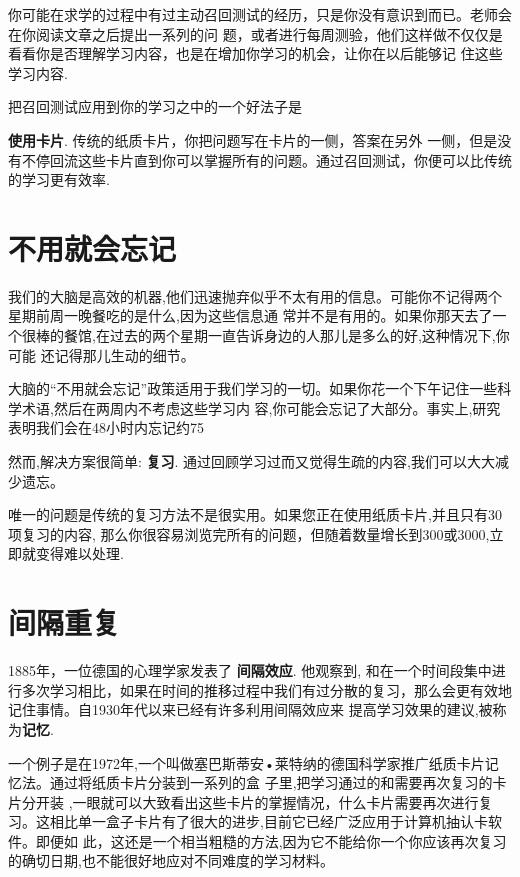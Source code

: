 \documentclass[a4paper]{book}
\begin{document}
你可能在求学的过程中有过主动召回测试的经历，只是你没有意识到而已。老师会在你阅读文章之后提出一系列的问 题，或者进行每周测验，他们这样做不仅仅是看看你是否理解学习内容，也是在增加你学习的机会，让你在以后能够记 住这些学习内容.

把召回测试应用到你的学习之中的一个好法子是

\textbf{使用卡片}. 传统的纸质卡片，你把问题写在卡片的一侧，答案在另外 一侧，但是没有不停回流这些卡片直到你可以掌握所有的问题。通过召回测试，你便可以比传统的学习更有效率.

\section{不用就会忘记}

我们的大脑是高效的机器,他们迅速抛弃似乎不太有用的信息。可能你不记得两个星期前周一晚餐吃的是什么,因为这些信息通 常并不是有用的。如果你那天去了一个很棒的餐馆,在过去的两个星期一直告诉身边的人那儿是多么的好,这种情况下,你可能 还记得那儿生动的细节。

大脑的“不用就会忘记”政策适用于我们学习的一切。如果你花一个下午记住一些科学术语,然后在两周内不考虑这些学习内 容,你可能会忘记了大部分。事实上,研究表明我们会在48小时内忘记约75%

然而,解决方案很简单: \textbf{复习}. 通过回顾学习过而又觉得生疏的内容,我们可以大大减少遗忘。

唯一的问题是传统的复习方法不是很实用。如果您正在使用纸质卡片,并且只有30项复习的内容, 那么你很容易浏览完所有的问题，但随着数量增长到300或3000,立即就变得难以处理.

\section{间隔重复}

1885年，一位德国的心理学家发表了 \textbf{间隔效应}. 他观察到, 和在一个时间段集中进行多次学习相比，如果在时间的推移过程中我们有过分散的复习，那么会更有效地记住事情。自1930年代以来已经有许多利用间隔效应来 提高学习效果的建议,被称为\textbf{记忆}.

一个例子是在1972年,一个叫做塞巴斯蒂安•莱特纳的德国科学家推广纸质卡片记忆法。通过将纸质卡片分装到一系列的盒 子里,把学习通过的和需要再次复习的卡片分开装 ,一眼就可以大致看出这些卡片的掌握情况，什么卡片需要再次进行复习。这相比单一盒子卡片有了很大的进步,目前它已经广泛应用于计算机抽认卡软件。即便如 此，这还是一个相当粗糙的方法,因为它不能给你一个你应该再次复习的确切日期,也不能很好地应对不同难度的学习材料。
\end{document}
